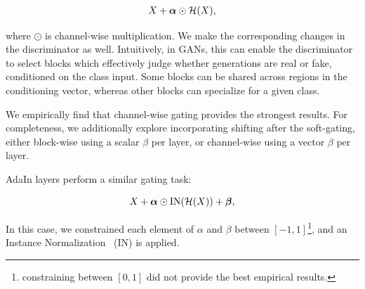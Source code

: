 \begin{align}
X + \mbox{\boldmath $\alpha$} \odot \mathcal{H}(X), 
\end{align}

where $\odot$ is channel-wise multiplication. We make the corresponding changes in the discriminator as well. 
Intuitively, in GANs, this can enable the discriminator to select blocks which effectively judge whether generations are real or fake, conditioned on the class input.
Some blocks can be shared across regions in the conditioning vector, whereas other blocks can specialize for a given class.

We empirically find that channel-wise gating provides the strongest results. 
For completeness, we additionally explore incorporating shifting after the soft-gating, either block-wise using a scalar $\beta$ per layer, or channel-wise using a vector {\boldmath $\beta$} per layer.




AdaIn layers perform a similar gating task:

\begin{equation}
X + \mbox{\boldmath $\alpha$} \odot \text{IN} (\mathcal{H}(X)) + \mbox{\boldmath $\beta$}, 
\end{equation}

In this case, we constrained each element of {\boldmath $\alpha$} and {\boldmath $\beta$} between $[-1, 1]$\footnote{constraining between \( [0, 1] \) did not provide the best empirical results.}, and an Instance Normalization~\cite{ulyanovinstance} (IN) is applied.




